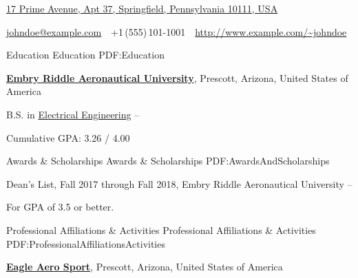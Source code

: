 \documentclass[letterpaper,MMMyyyy,nonstopmode]{simpleresumecv}
\newcommand{\CVAuthor}{Charles Long}
\newcommand{\CVWebpage}{http://www.example.com/~johndoe}
\begin{document}

\Title{\CVAuthor}

\begin{SubTitle}
\href{https://www.google.com/maps/place/17+Prime+Avenue,+Springfield,+Pennsylvania+10111,+USA}
{17 Prime Avenue, Apt 37, Springfield, Pennsylvania 10111, USA}
\par
\href{mailto:johndoe@example.com}
{johndoe@example.com}
\,\SubBulletSymbol\,
+1\,(555)\,101-1001
\,\SubBulletSymbol\,
\href{\CVWebpage}
{\url{\CVWebpage}}
\end{SubTitle}

\begin{Body}


\Section
{Education}
{Education}
{PDF:Education}

\Entry
\href{https://prescott.erau.edu/}
{\textbf{Embry Riddle Aeronautical University}},
Prescott, Arizona, United States of America

\Gap
\BulletItem
B.S. in
\href{https://prescott.erau.edu/college-engineering/computer-electrical-software}
{Electrical Engineering}
\hfill
{} --
\begin{Detail}
\SubBulletItem
Cumulative GPA: 3.26 / 4.00
\end{Detail}


\Section
{Awards \&\newline
Scholarships}
{Awards \& Scholarships}
{PDF:AwardsAndScholarships}

\BulletItem
Dean's List,
Fall 2017 through Fall 2018,
Embry Riddle Aeronautical University
\hfill
{} --
\begin{Detail}
\Item
For GPA of 3.5 or better.
\end{Detail}



\Section
{Professional Affiliations\newline
\& Activities}
{Professional Affiliations \& Activities}
{PDF:ProfessionalAffiliationsActivities}

\Entry
\href{http://www.example.com/my-society}
{\textbf{Eagle Aero Sport}},
\newline
Prescott, Arizona, United States of America


\end{Body}
\end{document}
